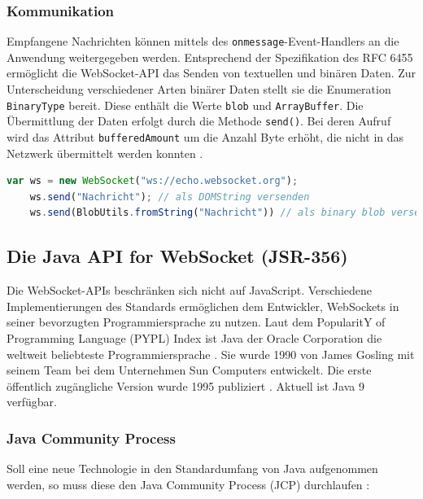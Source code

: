 \documentclass[11pt,a4paper,titlepage]{scrartcl}
\numberwithin{equation}{section}
\begin{document}
\subsubsection{Kommunikation}
Empfangene Nachrichten können mittels des \texttt{onmessage}-Event-Handlers an die Anwendung weitergegeben werden. Entsprechend der Spezifikation des RFC 6455 ermöglicht die WebSocket-API das Senden von textuellen und binären Daten. Zur Unterscheidung verschiedener Arten binärer Daten stellt sie die Enumeration \texttt{BinaryType} bereit. Diese enthält die Werte \texttt{blob} und \texttt{ArrayBuffer}. Die Übermittlung der Daten erfolgt durch die Methode \texttt{send()}. Bei deren Aufruf wird das Attribut \texttt{bufferedAmount} um die Anzahl Byte erhöht, die nicht in das Netzwerk übermittelt werden konnten \autocite{whatwg_html_2010}. \\

\begin{lstlisting}[frame=single, language=JavaScript, caption=WebSocket-Nachrichten senden]
	var ws = new WebSocket("ws://echo.websocket.org");
	ws.send("Nachricht"); // als DOMString versenden
	ws.send(BlobUtils.fromString("Nachricht")) // als binary blob versenden
\end{lstlisting}

\subsection{Die Java\texttrademark{} API for WebSocket (JSR-356)}
\noindent Die WebSocket-APIs beschränken sich nicht auf JavaScript. Verschiedene Implementierungen des Standards ermöglichen dem Entwickler, WebSockets in seiner bevorzugten Programmiersprache zu nutzen. Laut dem PopularitY of Programming Language (PYPL) Index ist Java der Oracle Corporation die weltweit beliebteste Programmiersprache \autocite{cabonnelle_pypl_2017}. Sie wurde 1990 von James Gosling mit seinem Team bei dem Unternehmen Sun Computers entwickelt. Die erste öffentlich zugängliche Version wurde 1995 publiziert \autocite{smyth_brief_2009}. Aktuell ist Java 9 verfügbar. 

\subsubsection*{Java Community Process}
Soll eine neue Technologie in den Standardumfang von Java aufgenommen werden, so muss diese den Java Community Process (JCP) durchlaufen \autocite{oracle_corporation_java_2017}: \\
\end{document}
